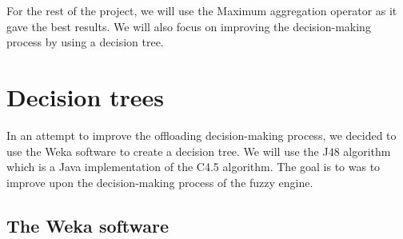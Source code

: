 \begin{table}[H]
	\bigskip

	\centering
	\caption{Sample results from the fuzzy engine with the Bounded sum aggregation operator.}
	\label{tab:fuzzy-results-bounded}
\end{table}

For the rest of the project, we will use the Maximum aggregation operator as it gave the best results. We will also focus
on improving the decision-making process by using a decision tree.

\chapter{Decision trees}
\label{chap:decision-trees}

In an attempt to improve the offloading decision-making process, we decided to use the Weka\cite{weka} software to create
a decision tree. We will use the J48 algorithm which is a Java implementation of the C4.5 algorithm. The goal is to was to
improve upon the decision-making process of the fuzzy engine.

\section{The Weka software}
\label{sec:weka}

